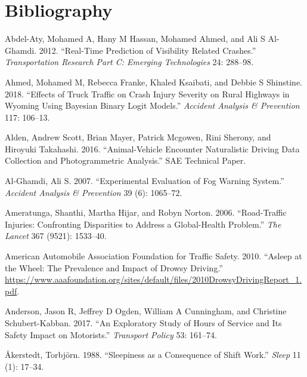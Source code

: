 \documentclass[12pt]{book}
\numberwithin{equation}{chapter}
\begin{document}
\hypertarget{bibliography}{%
\chapter*{Bibliography}\label{bibliography}}

\hypertarget{refs}{}
\leavevmode\hypertarget{ref-abdel2012real}{}%
Abdel-Aty, Mohamed A, Hany M Hassan, Mohamed Ahmed, and Ali S Al-Ghamdi. 2012. ``Real-Time Prediction of Visibility Related Crashes.'' \emph{Transportation Research Part C: Emerging Technologies} 24: 288--98.

\leavevmode\hypertarget{ref-ahmed2018effects}{}%
Ahmed, Mohamed M, Rebecca Franke, Khaled Ksaibati, and Debbie S Shinstine. 2018. ``Effects of Truck Traffic on Crash Injury Severity on Rural Highways in Wyoming Using Bayesian Binary Logit Models.'' \emph{Accident Analysis \& Prevention} 117: 106--13.

\leavevmode\hypertarget{ref-alden2016animal}{}%
Alden, Andrew Scott, Brian Mayer, Patrick Mcgowen, Rini Sherony, and Hiroyuki Takahashi. 2016. ``Animal-Vehicle Encounter Naturalistic Driving Data Collection and Photogrammetric Analysis.'' SAE Technical Paper.

\leavevmode\hypertarget{ref-al2007experimental}{}%
Al-Ghamdi, Ali S. 2007. ``Experimental Evaluation of Fog Warning System.'' \emph{Accident Analysis \& Prevention} 39 (6): 1065--72.

\leavevmode\hypertarget{ref-ameratunga2006road}{}%
Ameratunga, Shanthi, Martha Hijar, and Robyn Norton. 2006. ``Road-Traffic Injuries: Confronting Disparities to Address a Global-Health Problem.'' \emph{The Lancet} 367 (9521): 1533--40.

\leavevmode\hypertarget{ref-aaafoundation}{}%
American Automobile Association Foundation for Traffic Safety. 2010. ``Asleep at the Wheel: The Prevalence and Impact of Drowsy Driving.'' \url{https://www.aaafoundation.org/sites/default/files/2010DrowsyDrivingReport_1.pdf}.

\leavevmode\hypertarget{ref-anderson2017exploratory}{}%
Anderson, Jason R, Jeffrey D Ogden, William A Cunningham, and Christine Schubert-Kabban. 2017. ``An Exploratory Study of Hours of Service and Its Safety Impact on Motorists.'' \emph{Transport Policy} 53: 161--74.

\leavevmode\hypertarget{ref-aakerstedt1988sleepiness}{}%
Åkerstedt, Torbjörn. 1988. ``Sleepiness as a Consequence of Shift Work.'' \emph{Sleep} 11 (1): 17--34.
\end{document}
